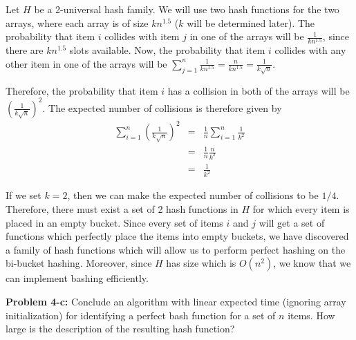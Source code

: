 \documentclass[psamsfonts]{amsart}
\newenvironment{sol}{\vspace{0.25cm}{\large \bfseries Solution:}}{\qedsymbol}
\newenvironment{prob}[1]{\begin{framed}{\large \bfseries Problem #1:}}{\end{framed}}
\begin{document}
\begin{sol}
Let $H$ be a 2-universal hash family. We will use two hash functions for the two arrays, where each array is of size $kn^{1.5}$ ($k$ will be determined later). The probability that item $i$ collides with item $j$ in one of the arrays will be $\frac{1}{kn^{1.5}}$, since there are $kn^{1.5}$ slots available. Now, the probability that item $i$ collides with any other item in one of the arrays will be $\sum_{j=1}^n \frac{1}{kn^{1.5}} = \frac{n}{kn^{1.5}} = \frac{1}{k \sqrt{n}}$. 

Therefore, the probability that item $i$ has a collision in both of the arrays will be $\left( \frac{1}{k \sqrt{n}} \right)^2$. The expected number of collisions is therefore given by
\begin{eqnarray}
\sum_{i=1}^n \left( \frac{1}{k\sqrt{n}} \right)^2 &=& \frac{1}{n} \sum_{i=1}^n \frac{1}{k^2} \\
&=& \frac{1}{n} \frac{n}{k^2} \\
&=& \frac{1}{k^2}
\end{eqnarray}

If we set $k=2$, then we can make the expected number of collisions to be $1/4$. Therefore, there must exist a set of 2 hash functions in $H$ for which every item is placed in an empty bucket. Since every set of items $i$ and $j$ will get a set of functions which perfectly place the items into empty buckets, we have discovered a family of hash functions which will allow us to perform perfect hashing on the bi-bucket hashing. Moreover, since $H$ has size which is $O(n^2)$, we know that we can implement bashing efficiently.
\end{sol}

\begin{prob}{4-c}
Conclude an algorithm with linear expected time (ignoring array initialization) for identifying a perfect bash function for a set of $n$ items. How large is the description of the resulting hash function?
\end{prob}

\begin{sol}

\end{sol}
\end{document}

